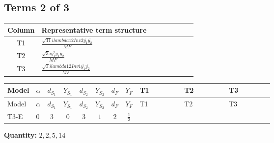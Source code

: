 \documentclass[8pt]{article}
\begin{document}
\begin{landscape}
\subsection*{Terms 2 of 3}
\begin{center}
\begin{tabular}{@{}c >{\raggedright\arraybackslash}p{0.82\linewidth}@{}}
\toprule
Column & Representative term structure \\
\midrule
T1 & \(\displaystyle \frac{\sqrt{11} i lambda12Inv2 \overline{y_{1}} \overline{y_{2}}}{MF}\) \\
\midrule
T2 & \(\displaystyle \frac{\sqrt{3} i g_{1}^{2} \overline{y_{1}} \overline{y_{2}}}{MF}\) \\
\midrule
T3 & \(\displaystyle \frac{\sqrt{3} i lambda12Inv1 \overline{y_{1}} \overline{y_{2}}}{MF}\) \\
\midrule
\bottomrule
\end{tabular}
\end{center}
\smallskip
\tiny
\begin{longtable}{@{}llcccccc >{\raggedright\arraybackslash}p{0.21\linewidth} >{\raggedright\arraybackslash}p{0.21\linewidth} >{\raggedright\arraybackslash}p{0.21\linewidth}@{}}
\toprule
Model & $\alpha$ & $d_{S_1}$ & $Y_{S_1}$ & $d_{S_2}$ & $Y_{S_2}$ & $d_F$ & $Y_F$ & T1 & T2 & T3 \\
\midrule
\endfirsthead
\toprule
Model & $\alpha$ & $d_{S_1}$ & $Y_{S_1}$ & $d_{S_2}$ & $Y_{S_2}$ & $d_F$ & $Y_F$ & T1 & T2 & T3 \\
\midrule
\endhead
T3-E & $0$ & $3$ & $0$ & $3$ & $1$ & $2$ & $\frac{1}{2}$ & \scriptsize\adjustbox{max width=\linewidth}{$\begin{gathered} - \frac{3 \sqrt{11} i lambda12Inv2 \overline{y_{1}} \overline{y_{2}}}{22 MF}\end{gathered}$} & \scriptsize\adjustbox{max width=\linewidth}{$\begin{gathered} - \frac{\sqrt{3} i g_{1}^{2} \overline{y_{1}} \overline{y_{2}}}{8 MF}\end{gathered}$} & \scriptsize\adjustbox{max width=\linewidth}{$\begin{gathered} \frac{\sqrt{3} i lambda12Inv1 \overline{y_{1}} \overline{y_{2}}}{6 MF}\end{gathered}$} \\
\midrule
\bottomrule
\end{longtable}
\clearpage
\noindent\textbf{Quantity: }$\mathrm{2,2,5,14}$\par\smallskip

\end{landscape}
\end{document}
